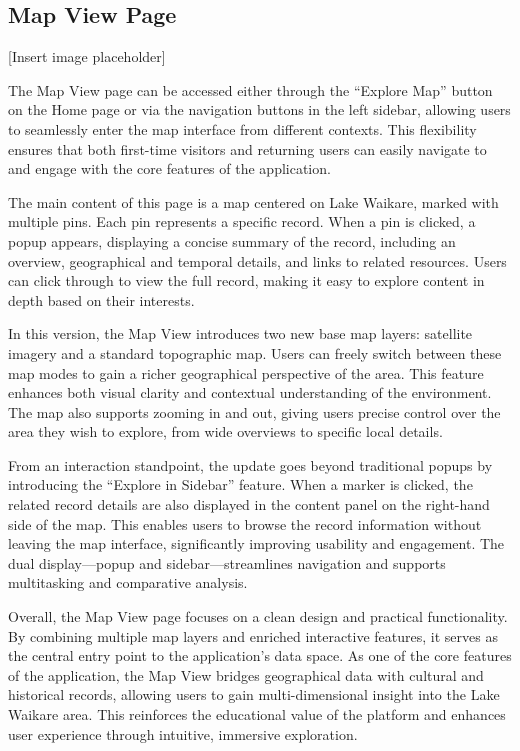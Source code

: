 \subsection{Map View Page}
[Insert image placeholder]

The Map View page can be accessed either through the “Explore Map” button on the Home page or via the navigation buttons in the left sidebar, allowing users to seamlessly enter the map interface from different contexts. This flexibility ensures that both first-time visitors and returning users can easily navigate to and engage with the core features of the application.

The main content of this page is a map centered on Lake Waikare, marked with multiple pins. Each pin represents a specific record. When a pin is clicked, a popup appears, displaying a concise summary of the record, including an overview, geographical and temporal details, and links to related resources. Users can click through to view the full record, making it easy to explore content in depth based on their interests.

In this version, the Map View introduces two new base map layers: satellite imagery and a standard topographic map. Users can freely switch between these map modes to gain a richer geographical perspective of the area. This feature enhances both visual clarity and contextual understanding of the environment. The map also supports zooming in and out, giving users precise control over the area they wish to explore, from wide overviews to specific local details.

From an interaction standpoint, the update goes beyond traditional popups by introducing the “Explore in Sidebar” feature. When a marker is clicked, the related record details are also displayed in the content panel on the right-hand side of the map. This enables users to browse the record information without leaving the map interface, significantly improving usability and engagement. The dual display—popup and sidebar—streamlines navigation and supports multitasking and comparative analysis.

Overall, the Map View page focuses on a clean design and practical functionality. By combining multiple map layers and enriched interactive features, it serves as the central entry point to the application’s data space. As one of the core features of the application, the Map View bridges geographical data with cultural and historical records, allowing users to gain multi-dimensional insight into the Lake Waikare area. This reinforces the educational value of the platform and enhances user experience through intuitive, immersive exploration.

